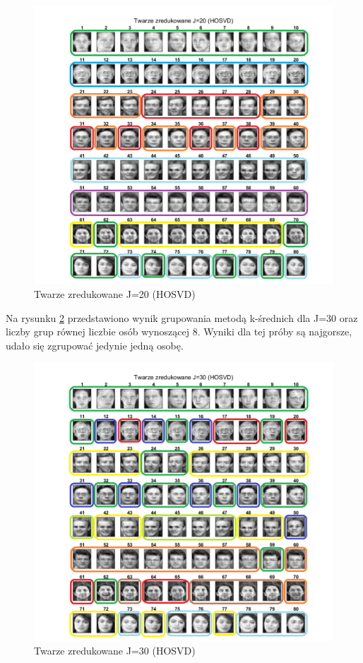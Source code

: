 \documentclass[11pt, a4paper]{article}
\newcommand{\fbi}{\leavevmode{\parindent=1em\indent}}
\begin{document}
\begin{figure}[H]
	\centering
	\includegraphics[width=1\textwidth]{./assets/rezultat_HOSVD_j20.png}
	\caption{Twarze zredukowane J=20 (HOSVD)}
	\label{fig:rezultat_HOSVD_j20}
\end{figure}

\newpage
\fbi
Na rysunku \ref{fig:rezultat_HOSVD_j30} przedstawiono wynik grupowania metodą k-średnich dla J=30 oraz liczby grup równej liczbie osób wynoszącej 8. Wyniki dla tej próby są najgorsze, udało się zgrupować jedynie jedną osobę.

\begin{figure}[H]
	\centering
	\includegraphics[width=1\textwidth]{./assets/rezultat_HOSVD_j30.png}
	\caption{Twarze zredukowane J=30 (HOSVD)}
	\label{fig:rezultat_HOSVD_j30}
\end{figure}
\end{document}
